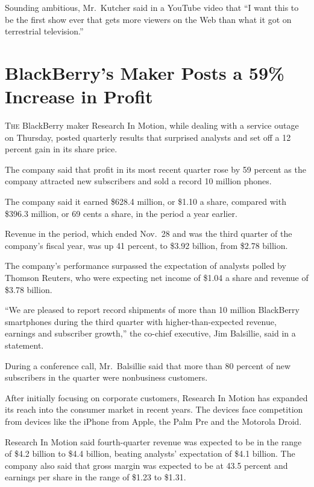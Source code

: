 ﻿\documentclass[12pt]{article}
\begin{document}
Sounding ambitious, Mr.~Kutcher said in a YouTube video that ``I want this to be the first show ever
that gets more viewers on the Web than what it got on terrestrial television.''

\section{BlackBerry's Maker Posts a 59\% Increase in Profit}

\lettrine{T}{he} BlackBerry maker Research In Motion, while dealing with a
service outage on Thursday, posted quarterly results that surprised analysts and set off a 12
percent gain in its share price.

The company said that profit in its most recent quarter rose by 59 percent as the company attracted
new subscribers and sold a record 10 million phones.

The company said it earned \$628.4 million, or \$1.10 a share, compared with \$396.3 million, or 69
cents a share, in the period a year earlier.

Revenue in the period, which ended Nov.~28 and was the third quarter of the company's fiscal year,
was up 41 percent, to \$3.92 billion, from \$2.78 billion.

The company's performance surpassed the expectation of analysts polled by Thomson Reuters, who were
expecting net income of \$1.04 a share and revenue of \$3.78 billion.

``We are pleased to report record shipments of more than 10 million BlackBerry smartphones during
the third quarter with higher-than-expected revenue, earnings and subscriber growth,'' the co-chief
executive, Jim Balsillie, said in a statement.

During a conference call, Mr.~Balsillie said that more than 80 percent of new subscribers in the
quarter were nonbusiness customers.

After initially focusing on corporate customers, Research In Motion has expanded its reach into the
consumer market in recent years. The devices face competition from devices like the iPhone from
Apple, the Palm Pre and the Motorola Droid.

Research In Motion said fourth-quarter revenue was expected to be in the range of \$4.2 billion to
\$4.4 billion, beating analysts' expectation of \$4.1 billion. The company also said that gross
margin was expected to be at 43.5 percent and earnings per share in the range of \$1.23 to \$1.31.
\end{document}
